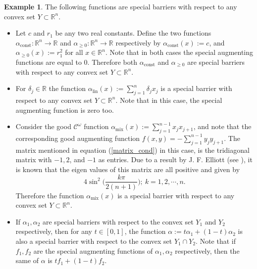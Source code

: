\documentclass[12pt,reqno, a4paper]{amsart}
\theoremstyle{definition}
\theoremstyle{definition}
\newtheorem{example}[theorem]{Example}
\numberwithin{equation}{section}
\def\R{\mathbb{R}}                              %
\begin{document}
\begin{example}\label{ex_special_bar}
The following functions are special barriers with respect to any convex set $Y\subset \R^n.$
\begin{itemize}
\item [(i)] Let $c$ and $r_1$ be any two real constants. Define the two functions  ${\alpha_{\text{const}}:\R^n \to \R}$ and $\alpha_{\geq0}:\R^n \to \R$ respectively by $\alpha_{\text{const}}(x):=c$, and $\alpha_{\geq0}(x):=r_1^2$ for all $x\in \R^n$. Note that in both cases the special augmenting functions are equal to $0$. Therefore both $\alpha_{\text{const}}$ and $\alpha_{\geq0}$ are special barriers with respect to any convex set $Y\subset \R^n.$
\item [(ii)] For $\delta_j\in \R$ the function $\alpha_{\text{lin}}(x):=\sum_{j=1}^{n}\delta_jx_j$ is a special barrier with respect to any convex set $Y\subset \R^n.$ Note that in this case, the special augmenting function is zero too.

\item[(iii)] Consider the good $\mathcal{C}^{\omega}$ function $\alpha_{\text{mix}}(x):=\sum_{j=1}^{n-1}x_jx_{j+1}$, and note that the corresponding good augmenting function $f(x,y)=-\sum_{j=1}^{n-1}y_jy_{j+1}$. The matrix mentioned in equation (\ref{matrix_cond}) in this case, is the tridiagonal matrix with $-1, 2$, and $-1$ as entries. Due to a result by J. F. Elliott (see \cite{elli}), it is known that the eigen values of this matrix are all positive and given by $$4 \sin^2\Big(\frac{k\pi}{2(n+1)}\Big); ~ k=1,2,\cdots,n.$$
 Therefore the function $\alpha_{\text{mix}}(x)$ is a special barrier with respect to any convex set $Y\subset \R^n.$
 
\item[(iv)] If $\alpha_1, \alpha_2$ are special barriers  with respect to the convex set $Y_1$ and $Y_2$ respectively, then for any $t\in [0,1]$, the function $\alpha:=t\alpha_1+(1-t)\alpha_2$ is also a special barrier with respect to the convex set $Y_1\cap Y_2$. Note that if $f_1,f_2$ are the special augmenting functions of $\alpha_1,\alpha_2$ respectively, then the same of $\alpha$ is $tf_1+(1-t)f_2$. 
\end{itemize}	
\end{example}
\end{document}
